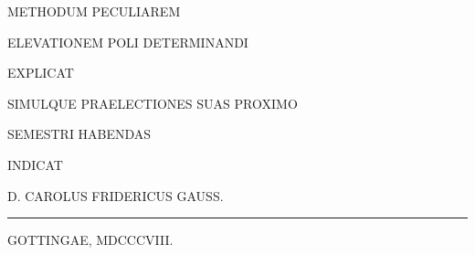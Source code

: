 \clearpage\thispagestyle{empty}
\begin{center}\vspace*{.45in}
{\Large METHODUM PECULIAREM}\par\bigskip
{\LARGE ELEVATIONEM POLI DETERMINANDI}\par\bigskip
EXPLICAT\par\bigskip
SIMULQUE PRAELECTIONES SUAS PROXIMO\par\medskip
SEMESTRI HABENDAS\par\bigskip
INDICAT\par\bigskip
{\large D. CAROLUS FRIDERICUS GAUSS.}\par\vfill
\rule{.75\linewidth}{.3pt}\par\smallskip
GOTTINGAE, MDCCCVIII.
\end{center}\clearpage
